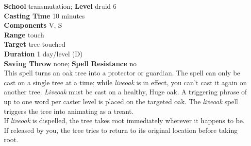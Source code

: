 \textbf{School} transmutation; \textbf{Level} druid 6\\
\textbf{Casting Time} 10 minutes\\
\textbf{Components} V, S\\
\textbf{Range} touch\\
\textbf{Target} tree touched\\
\textbf{Duration} 1 day/level (D)\\
\textbf{Saving Throw} none; \textbf{Spell Resistance} no\\
This spell turns an oak tree into a protector or guardian. The spell can only be cast on a single tree at a time; while \textit{liveoak }is in effect, you can't cast it again on another tree. \textit{Liveoak }must be cast on a healthy, Huge oak. A triggering phrase of up to one word per caster level is placed on the targeted oak. The \textit{liveoak }spell triggers the tree into animating as a treant. \\
If \textit{liveoak }is dispelled, the tree takes root immediately wherever it happens to be. If released by you, the tree tries to return to its original location before taking root.\\
